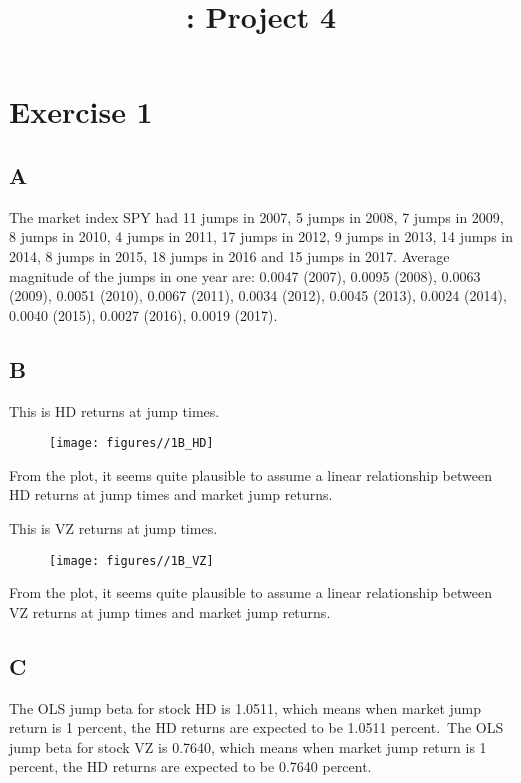 \documentclass{report}
\title{\LectureTitle: Project 4}
\begin{document}
\maketitle
\newpage

\section{Exercise 1}

\subsection{A}

The market index SPY had 11 jumps in 2007, 5 jumps in 2008, 7 jumps in 2009, 8 jumps in 2010, 4 jumps in 2011, 17 jumps in 2012, 9 jumps in 2013, 14 jumps in 2014, 8 jumps in 2015, 18 jumps in 2016 and 15 jumps in 2017. Average magnitude of the jumps in one year are: 0.0047 (2007), 0.0095 (2008), 0.0063 (2009), 0.0051 (2010), 0.0067 (2011), 0.0034 (2012), 0.0045 (2013), 0.0024 (2014), 0.0040 (2015), 0.0027 (2016), 0.0019 (2017).

\subsection{B}

This is HD returns at jump times.
\begin{figure}[H]
        \centering 
         \texttt{[image: figures//1B\_HD]}
\end{figure}

From the plot, it seems quite plausible to assume a linear relationship between HD returns at jump times and market jump returns.

This is VZ returns at jump times.
\begin{figure}[H]
        \centering 
         \texttt{[image: figures//1B\_VZ]}
\end{figure}

From the plot, it seems quite plausible to assume a linear relationship between VZ returns at jump times and market jump returns.

\subsection{C}

The OLS jump beta for stock HD is 1.0511, which means when market jump return is 1 percent, the HD returns are expected to be 1.0511 percent.\
The OLS jump beta for stock VZ is 0.7640, which means when market jump return is 1 percent, the HD returns are expected to be 0.7640 percent.
\end{document}
